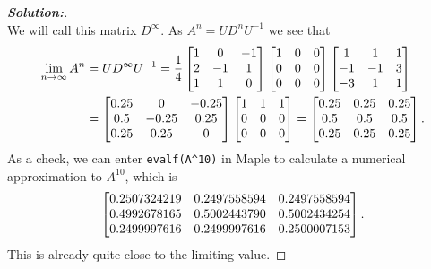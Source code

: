 \documentclass[a4paper]{amsart}
\theoremstyle{definition}
\newenvironment{solution}{\begin{proof}[\textbf{Solution:}] \vphantom{u}}{\end{proof}}
\begin{document}
\begin{solution}
\[ \]
 We will call this matrix $D^\infty$. As $A^n=UD^nU^{-1}$ we see that 
 \begin{align*}
  \lim_{n\to\infty} A^n &= UD^\infty U^{-1} = 
     \frac{1}{4}
     \left[\begin{matrix} 1 & 0 & -1 \\ 2 & -1 & 1 \\ 1 & 1 & 0 \end{matrix}\right]
     \left[\begin{matrix} 1 & 0 & 0 \\ 0 & 0 & 0 \\ 0 & 0 & 0 \end{matrix}\right] 
     \left[\begin{matrix} 1&1&1 \\ -1&-1&3 \\ -3&1&1 \end{matrix}\right] \\
   &=
   \left[\begin{matrix} 0.25 & 0 & -0.25 \\ 0.5 & -0.25 & 0.25 \\ 0.25 & 0.25 & 0 \end{matrix}\right]
   \left[\begin{matrix} 1&1&1 \\ 0&0&0 \\ 0&0&0 \end{matrix}\right] = 
   \left[\begin{matrix} 0.25 & 0.25 & 0.25 \\ 0.5 & 0.5 & 0.5 \\ 0.25 & 0.25 & 0.25 \end{matrix}\right].
 \end{align*}
 As a check, we can enter \verb+evalf(A^10)+ in Maple to calculate a
 numerical approximation to $A^{10}$, which is
 \[ \left[\begin{matrix} 0.2507324219 & 0.2497558594 & 0.2497558594 \\
         0.4992678165 & 0.5002443790 & 0.5002434254 \\
         0.2499997616 & 0.2499997616 & 0.2500007153 \end{matrix}\right].
 \]
 This is already quite close to the limiting value.
\end{solution}
\end{document}
